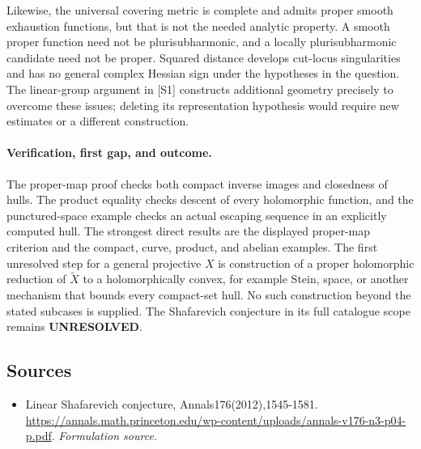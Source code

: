 \documentclass[11pt]{article}
\begin{document}
Likewise, the universal covering metric is complete and admits proper
smooth exhaustion functions, but that is not the needed analytic
property. A smooth proper function need not be plurisubharmonic, and
a locally plurisubharmonic candidate need not be proper. Squared
distance develops cut-locus singularities and has no general complex
Hessian sign under the hypotheses in the question. The linear-group
argument in [S1] constructs additional geometry precisely to overcome
these issues; deleting its representation hypothesis would require
new estimates or a different construction.

\paragraph{Verification, first gap, and outcome.}
The proper-map proof checks both compact inverse images and closedness
of hulls. The product equality checks descent of every holomorphic
function, and the punctured-space example checks an actual escaping
sequence in an explicitly computed hull. The strongest direct results
are the displayed proper-map criterion and the compact, curve, product,
and abelian examples. The first unresolved step for a general
projective $X$ is construction of a proper holomorphic reduction of
$\widetilde X$ to a holomorphically convex, for example Stein, space,
or another mechanism that bounds every compact-set hull. No such
construction beyond the stated subcases is supplied. The Shafarevich
conjecture in its full catalogue scope remains \textbf{UNRESOLVED}.

\subsection{Sources}
\begin{itemize}
\item[S1]Linear Shafarevich conjecture, Annals176(2012),1545-1581.
\url{https://annals.math.princeton.edu/wp-content/uploads/annals-v176-n3-p04-p.pdf}.
\textit{Formulation source.}
\end{itemize}
\end{document}
